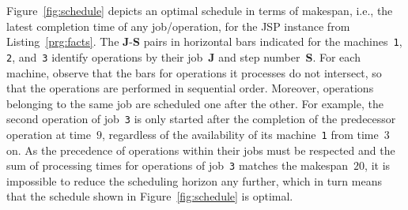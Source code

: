 \documentclass{tlp} %
\begin{document}


Figure~\ref{fig:schedule} depicts an optimal schedule in terms of makespan,
i.e., the latest completion time of any job/operation,
for the JSP instance from Listing~\ref{prg:facts}.
The \textbf{J}-\textbf{S} pairs in horizontal bars indicated for the
machines~\lstinline{1}, \lstinline{2}, and~\lstinline{3} identify operations
by their job~\textbf{J} and step number~\textbf{S}.
For each machine, observe that the bars for operations it processes do not
intersect, so that the operations are performed in sequential order.
Moreover, operations belonging to the same job are scheduled one after the other.
For example,
the second operation of job~\lstinline{3} is only started after the
completion of the predecessor operation at time~$9$,
regardless of the availability of its machine~\lstinline{1}
from time~$3$ on.
As the precedence of operations within their jobs must be respected
and the sum of processing times for operations of job~\lstinline{3}
matches the makespan~$20$, it is impossible to reduce the scheduling
horizon any further,
which in turn means that the schedule shown in Figure~\ref{fig:schedule} is optimal.
%
\end{document}
